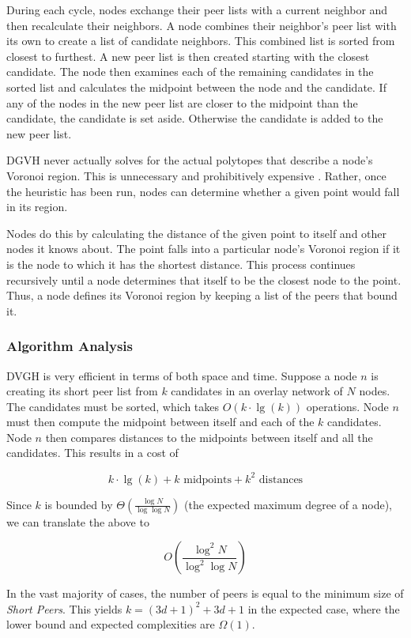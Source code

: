 During each cycle, nodes exchange their peer lists with a current neighbor and then recalculate their neighbors.
A node combines their neighbor's peer list with its own to create a list of candidate neighbors.
This combined list is sorted from closest to furthest.
A new peer list is then created starting with the closest candidate.
The node then examines each of the remaining candidates in the sorted list and calculates the midpoint between the node and the candidate.
If any of the nodes in the new peer list are closer to the midpoint than the candidate, the candidate is set aside.
Otherwise the candidate is added to the new peer list.


DGVH never actually solves for the actual polytopes that describe a node's Voronoi region.
This is unnecessary and prohibitively expensive \cite{raynet}.
Rather, once the heuristic has been run, nodes can determine whether a given point would fall in its region.

Nodes do this by calculating the distance of the given point to itself and other nodes it knows about.
The point falls into a particular node's Voronoi region if it is the node to which it has the shortest distance.
This process continues recursively until a node determines that itself to be the closest node to the point.
Thus, a node defines its Voronoi region by keeping a list of the peers that bound it.



\subsubsection{Algorithm Analysis}

DVGH is very efficient in terms of both space and time.
Suppose a node $n$ is creating its short peer list from $k$ candidates in an overlay network of $N$ nodes.
The candidates must be sorted, which takes $O(k\cdot\lg(k))$ operations.
Node $n$ must then compute the midpoint between itself and each of the $k$ candidates.
Node $n$ then compares distances to the midpoints between itself and all the candidates.
This results in a cost of

\[ k\cdot\lg(k) + k \text{ midpoints}  + k^{2} \text{ distances} \]


Since $k$ is  bounded by $\Theta(\frac{\log N}{\log \log N} )$ \cite{bern1991expected} (the expected maximum degree of a node), we can translate the above to

\[O(\frac{\log^{2} N}{\log^{2} \log N} )\]

In the vast majority of cases, the number of peers is equal to the minimum size of \textit{Short Peers}.
This yields $k=(3d+1)^{2}+3d+1$ in the expected case, where the lower bound and expected complexities are $\Omega(1)$.




